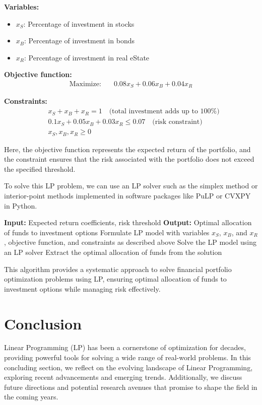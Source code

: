 \documentclass[12pt]{book} %
\begin{document}
\textbf{Variables:}
\begin{itemize}
    \item \(x_S\): Percentage of investment in stocks
    \item \(x_B\): Percentage of investment in bonds
    \item \(x_R\): Percentage of investment in real eState
\end{itemize}

\textbf{Objective function:}
\begin{align*}
\text{Maximize:} \quad & 0.08x_S + 0.06x_B + 0.04x_R
\end{align*}

\textbf{Constraints:}
\begin{align*}
& x_S + x_B + x_R = 1 \quad \text{(total investment adds up to 100\%)} \\
& 0.1x_S + 0.05x_B + 0.03x_R \leq 0.07 \quad \text{(risk constraint)} \\
& x_S, x_B, x_R \geq 0
\end{align*}

Here, the objective function represents the expected return of the portfolio, and the constraint ensures that the risk associated with the portfolio does not exceed the specified threshold.

To solve this LP problem, we can use an LP solver such as the simplex method or interior-point methods implemented in software packages like PuLP or CVXPY in Python.

\FloatBarrier
\begin{algorithm}
    \caption{Financial Portfolio Optimization using Linear Programming}
    \begin{algorithmic}[1]
        \State \textbf{Input:} Expected return coefficients, risk threshold
        \State \textbf{Output:} Optimal allocation of funds to investment options
        \State Formulate LP model with variables \(x_S\), \(x_B\), and \(x_R\), objective function, and constraints as described above
        \State Solve the LP model using an LP solver
        \State Extract the optimal allocation of funds from the solution
    \end{algorithmic}
\end{algorithm}
\FloatBarrier

This algorithm provides a systematic approach to solve financial portfolio optimization problems using LP, ensuring optimal allocation of funds to investment options while managing risk effectively.


\section{Conclusion}
Linear Programming (LP) has been a cornerstone of optimization for decades, providing powerful tools for solving a wide range of real-world problems. In this concluding section, we reflect on the evolving landscape of Linear Programming, exploring recent advancements and emerging trends. Additionally, we discuss future directions and potential research avenues that promise to shape the field in the coming years.
\end{document}
